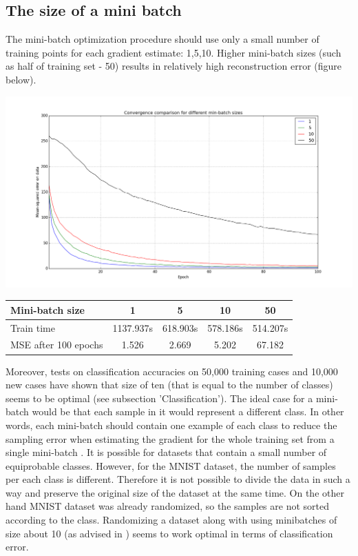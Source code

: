 \documentclass[a4paper]{scrartcl}
\begin{document}
\subsection{The size of a mini batch}
The mini-batch optimization procedure should use only a small number of training points for each gradient estimate: 1,5,10. Higher mini-batch sizes (such as half of training set - 50) results in relatively high reconstruction error (figure below). 
\begin{center}
\includegraphics[width=14cm]{images/batch.png}
\end{center}
\hspace{1cm}
\begin{tabular}{|l||c|c|c|c|} \hline
Mini-batch size & 1 & 5 & 10 & 50
\\ \hline
Train time & 1137.937s & 618.903s & 578.186s & 514.207s
\\ \hline
MSE after 100 epochs & 1.526 & 2.669 & 5.202 & 67.182
\\ \hline \end{tabular}
\vspace{1cm}
Moreover, tests on classification accuracies on 50,000 training cases and 10,000 new cases have shown that size of ten (that is equal to the number of classes) seems to be optimal (see subsection 'Classification'). The ideal case for a mini-batch would be that each sample in it would represent a different class. In other words, each mini-batch should contain one example of each class to reduce the sampling error when estimating the gradient for the whole training set from a single mini-batch \cite{Hinton}. It is possible for datasets that contain a small number of equiprobable classes. However, for the MNIST dataset, the number of samples per each class is different. Therefore it is not possible to divide the data in such a way and preserve the original size of the dataset at the same time. On the other hand MNIST dataset was already randomized, so the samples are not sorted according to the class. Randomizing a dataset along with using minibatches of size about 10 (as advised in \cite{Hinton}) seems to work optimal in terms of classification error.
\end{document}
